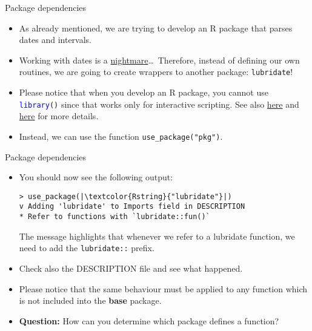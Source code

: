 \documentclass[
hyperref={bookmarks=false},
xcolor={dvipsnames,svgnames*,x11names*}, 
12pt
]{beamer}
\begin{document}
\begin{frame}[fragile]{Package dependencies}
\vspace{-0.5cm}
\begin{itemize}
\itemsep 2ex
\item As already mentioned, we are trying to develop an R package that parses dates and intervals. 
\item Working with dates is a \href{https://lubridate.tidyverse.org/articles/lubridate.html\#if-anyone-drove-a-time-machine-they-would-crash}{nightmare}\dots\, Therefore, instead of defining our own routines, we are going to create wrappers to another package: \texttt{lubridate}!
\item Please notice that when you develop an R package, you cannot use \texttt{\textcolor{blue}{library}()} since that works only for interactive scripting. See also \href{https://r-pkgs.org/dependencies-mindset-background.html}{here} and \href{https://r-pkgs.org/dependencies-in-practice.html}{here} for more details.  
\item Instead, we can use the function \texttt{use\_package(\textcolor{Rstring}{"pkg"})}. 
\end{itemize}
\end{frame}

\begin{frame}[fragile]{Package dependencies}
\vspace{-0.5cm}
\begin{itemize}
\itemsep 2ex
\item You should now see the following output: 
\begin{lstlisting}
> use_package(|\textcolor{Rstring}{"lubridate"}|)
v Adding 'lubridate' to Imports field in DESCRIPTION
* Refer to functions with `lubridate::fun()`
\end{lstlisting}
The message highlights that whenever we refer to a lubridate function, we need to add the \texttt{lubridate::} prefix. 

\item Check also the DESCRIPTION file and see what happened. 
\item Please notice that the same behaviour must be applied to any function which is not included into the \textbf{base} package. 
\item \textbf{Question:} How can you determine which package defines a function? 
\end{itemize}
\end{frame}
\end{document}

